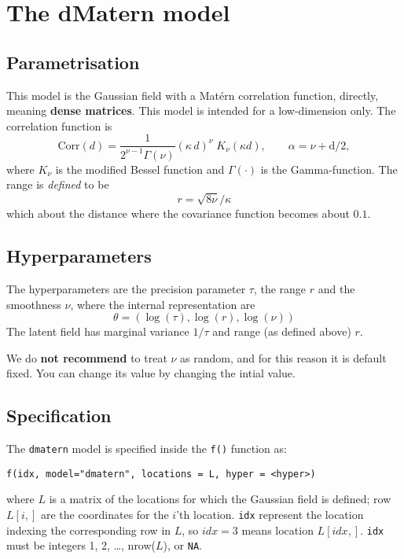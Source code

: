 \documentclass[a4paper,11pt]{article}
\begin{document}


\section*{The dMatern model}
\subsection*{Parametrisation}

This model is the Gaussian field with a Mat\'ern correlation function,
directly, meaning \textbf{dense matrices}. This model is intended for
a low-dimension only. The correlation function is 
\begin{displaymath}
    \text{Corr}(d)
    = \frac{1}{2^{\nu-1}\Gamma(\nu)}
    \left(\kappa\, {d}\right)^{\nu}
    \;
    K_{\nu}( \kappa d), \qquad \alpha = \nu + \text{d}/2,
\end{displaymath}
where $K_{\nu}$ is the modified Bessel function and $\Gamma(\cdot)$ is
the Gamma-function. The range is \emph{defined} to be
\begin{displaymath}
    r = {\sqrt{8\nu}}/{\kappa}
\end{displaymath}
which about the distance where the covariance function becomes
about $0.1$.

\subsection*{Hyperparameters}

The hyperparameters are the precision parameter $\tau$, the range $r$
and the smoothness $\nu$, where the internal representation are
\begin{displaymath}
    \theta = (\log(\tau), \log(r), \log(\nu))
\end{displaymath}
The latent field has marginal variance $1/\tau$ and range (as defined
above) $r$.

We do \textbf{not recommend} to treat $\nu$ as random, and for this
reason it is default fixed. You can change its value by changing the
intial value.

\subsection*{Specification}

The {\tt dmatern} model is specified inside the {\tt f()} function as:
\begin{verbatim}
f(idx, model="dmatern", locations = L, hyper = <hyper>)
\end{verbatim}
where $L$ is a matrix of the locations for which the Gaussian field is
defined; row $L[i,]$ are the coordinates for the $i$'th location.
\verb|idx| represent the location indexing the corresponding row in
$L$, so $idx=3$ means location $L[idx,]$. \verb|idx| must be integers
1, 2, \ldots, nrow($L$), or \texttt{NA}.
\end{document}
